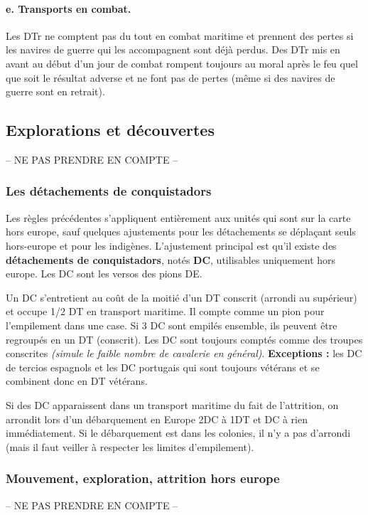 \paragraph{e. Transports en combat.}
Les DTr ne comptent pas du tout en combat maritime et prennent des pertes si les 
navires de guerre qui les accompagnent sont déjà perdus.
Des DTr mis en avant au début d'un jour de combat rompent toujours au moral
après le feu quel que soit le résultat adverse et ne font pas de pertes (même si des
navires de guerre sont en retrait).


\subsection{Explorations et découvertes}
-- NE PAS PRENDRE EN COMPTE --

\subsubsection{Les détachements de conquistadors}
Les règles précédentes s'appliquent entièrement aux unités qui sont sur la carte hors europe,
sauf quelques ajustements pour les détachements se déplaçant seuls hors-europe et pour les indigènes.
L'ajustement principal est qu'il existe des \textbf{détachements de conquistadors},
notés {\bf DC}, utilisables
uniquement hors europe. Les DC sont les versos des pions DE.

Un DC s'entretient au coût de la moitié d'un DT conscrit (arrondi au supérieur) et
occupe 1/2 DT en transport maritime. Il compte comme un pion pour
l'empilement dans une case. Si 3 DC sont empilés ensemble, ils peuvent
être regroupés en un DT (conscrit). Les DC sont toujours comptés comme des troupes
conscrites \textit{(simule le faible nombre de cavalerie en général)}.  
\textbf{Exceptions :}
les DC de tercios espagnols et les DC portugais qui sont toujours vétérans et
se combinent donc en DT vétérans.

Si des DC apparaissent dans un transport maritime du fait de l'attrition, on arrondit
lors d'un débarquement en Europe 2DC à 1DT et DC à rien immédiatement. Si le débarquement 
est dans les colonies, il n'y a pas d'arrondi (mais il faut veiller à respecter les limites
d'empilement).


\subsubsection{Mouvement, exploration, attrition hors europe}
-- NE PAS PRENDRE EN COMPTE --

